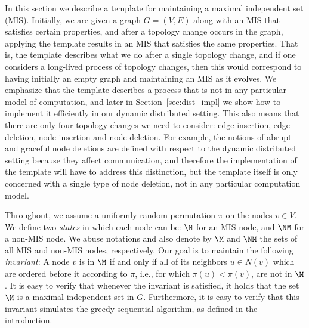 In this section we describe a template for maintaining a maximal independent set (MIS). Initially, we are given a graph $G=(V,E)$ along with an MIS that satisfies certain properties, and after a topology change occurs in the graph, applying the template results in an MIS that satisfies the same properties. That is, the template describes what we do after a single topology change, and if one considers a long-lived process of topology changes, then this would correspond to having initially an empty graph and maintaining an MIS as it evolves. We emphasize that the template describes a process that is not in any particular model of computation, and later in Section~\ref{sec:dist_impl} we show how to implement it efficiently in our dynamic distributed setting. This also means that there are only four topology changes we need to consider: edge-insertion, edge-deletion, node-insertion and node-deletion. For example, the notions of abrupt and graceful node deletions are defined with respect to the dynamic distributed setting because they affect communication, and therefore the implementation of the template will have to address this distinction, but the template itself is only concerned with a single type of node deletion, not in any particular computation model.


Throughout, we assume a uniformly random permutation $\pi$ on the nodes $v \in V$. We define two \emph{states} in which each node can be: $\M$  for an MIS node, and $\NM$ for a non-MIS node. We abuse notations and also denote by $\M$ and $\NM$ the sets of all MIS and non-MIS nodes, respectively. Our goal is to maintain the following \emph{\MIS invariant}: A node $v$ is in $\M$ if and only if all of its neighbors $u \in N(v)$ which are ordered before it according to $\pi$, i.e., for which $\pi(u) < \pi(v)$, are not in $\M$. It is easy to verify that whenever the \MIS invariant is satisfied, it holds that the set $\M$ is a maximal independent set in $G$.
Furthermore, it is easy to verify that this invariant simulates the greedy sequential algorithm, as defined in the introduction.

